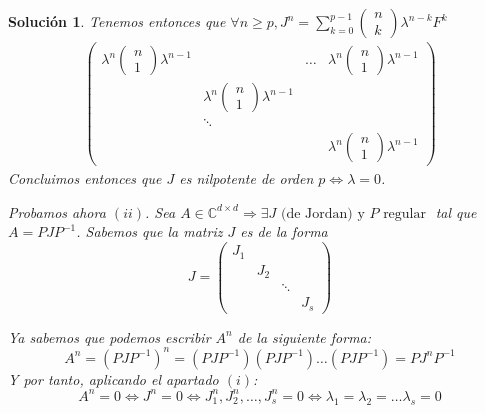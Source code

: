 \documentclass[11pt, a4paper]{article}
\newif\IfInSansMode
\theoremstyle{theorem-style}
\theoremstyle{definition-style}
\theoremstyle{remark-style}
\newtheorem*{sol}{Solución}
\theoremstyle{example-style}
\begin{document}
\begin{sol}
        Tenemos entonces que $\forall n \geq p, J^n = \sum^{p-1}_{k=0} \begin{pmatrix}
            n \\
            k
        \end{pmatrix} \lambda^{n-k} F^k$ 
        \begin{align*}
            \label{}
            \begin{pmatrix}
                \lambda^n \begin{pmatrix}
                    n \\
                    1
                \end{pmatrix} \lambda^{n-1} & & \hdots & \lambda^n \begin{pmatrix}
                    n \\
                    1
                \end{pmatrix} \lambda^{n-1} \\
                & \lambda^n \begin{pmatrix}
                    n \\
                    1
                \end{pmatrix} \lambda^{n-1} & & \\
                                            & \ddots & & \\
                                            & & & \lambda^n \begin{pmatrix}
                    n \\
                    1
                \end{pmatrix} \lambda^{n-1}
            \end{pmatrix}
        \end{align*}
        Concluimos entonces que $J$ es nilpotente de orden $p \Leftrightarrow \lambda = 0$.

        Probamos ahora $(ii)$. Sea $A \in \mathbb C^{d \times d} \Rightarrow \exists J \text{ (de Jordan) y } P \text{ regular }$ tal que $A = PJP^{-1}$. Sabemos que la matriz $J$ es de la forma $$ J= \begin{pmatrix}
            J_1 & & & \\
                & J_2 & & \\
                & & \ddots & \\
                & & & J_s
        \end{pmatrix}$$

Ya sabemos que podemos escribir $A^n$ de la siguiente forma: $$A^n = (PJP^{-1})^n = (PJP^{-1})(PJP^{-1}) \hdots (PJP^{-1}) = PJ^nP^{-1}$$
Y por tanto, aplicando el apartado $(i)$:
        $$A^n = 0 \Leftrightarrow J^n = 0 \Leftrightarrow J^n_1, J^n_2, \hdots, J^n_s = 0 \Leftrightarrow \lambda_1 = \lambda_2 = \hdots \lambda_s = 0$$
    \end{sol}
    
\end{document}
